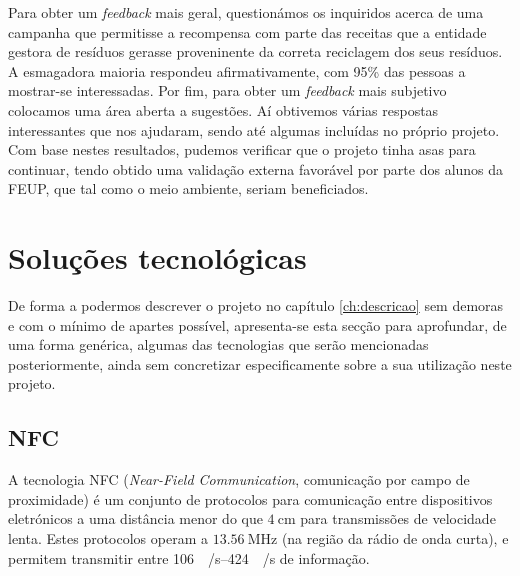 \documentclass[11pt, a4paper, oneside]{book}
\begin{document}
Para obter um \textit{feedback} mais geral, questionámos os inquiridos acerca de uma campanha que permitisse a recompensa com parte das receitas que a entidade gestora de resíduos gerasse proveninente da correta reciclagem dos seus resíduos. A esmagadora maioria respondeu afirmativamente, com 95\% das pessoas a mostrar-se interessadas.
Por fim, para obter um \textit{feedback} mais subjetivo colocamos uma área aberta a sugestões. Aí obtivemos várias respostas interessantes que nos ajudaram, sendo até algumas incluídas no próprio projeto.
Com base nestes resultados, pudemos verificar que o projeto tinha asas para continuar, tendo obtido uma validação externa favorável por parte dos alunos da FEUP, que tal como o meio ambiente, seriam beneficiados.



\section{Soluções tecnológicas}

De forma a podermos descrever o projeto no capítulo \ref{ch:descricao} sem demoras e com o mínimo de apartes possível, apresenta-se esta secção para aprofundar, de uma forma genérica, algumas das tecnologias que serão mencionadas posteriormente, ainda sem concretizar especificamente sobre a sua utilização neste projeto.

\subsection{NFC}

%   

A tecnologia NFC (\textit{Near-Field Communication}, comunicação por campo de proximidade) é um conjunto de protocolos para comunicação entre dispositivos eletrónicos a uma distância menor do que $\SI{4}{\centi\meter}$ para transmissões de velocidade lenta. Estes protocolos operam a $\SI{13.56}{\mega \hertz}$ (na região da rádio de onda curta), e permitem transmitir entre \SIrange{106}{424}{\kilo \bit / \second} de informação.
\end{document}
